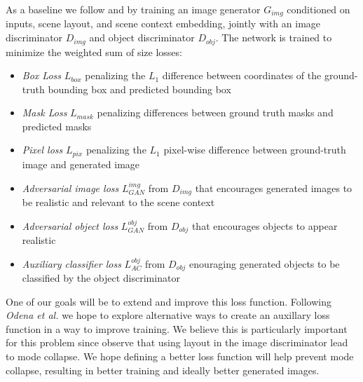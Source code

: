\documentclass{article}
\begin{document}
As a baseline we follow \cite{sg2im} and \cite{sg2imgcontext} by training an image generator $G_{img}$ conditioned on inputs, scene layout, and scene context embedding, jointly with an image discriminator $D_{img}$ and object discriminator $D_{obj}$. The network is trained to minimize the weighted sum of size losses:
\begin{itemize}
\item \textit{Box Loss} $L_{box}$ penalizing the $L_1$ difference between coordinates of the ground-truth bounding box and predicted bounding box
\item \textit{Mask Loss} $L_{mask}$ penalizing differences between ground truth masks and predicted masks
\item \textit{Pixel loss} $L_{pix}$ penalizing the $L_1$ pixel-wise difference between ground-truth image and generated image
\item \textit{Adversarial image loss} $L_{GAN}^{img}$ from $D_{img}$ that encourages generated images to be realistic and relevant to the scene context
\item \textit{Adversarial object loss} $L_{GAN}^{obj}$ from $D_{obj}$ that encourages objects to appear realistic
\item \textit{Auxiliary classifier loss} $L_{AC}^{obj}$ from $D_{obj}$ enouraging generated objects to be classified by the object discriminator
\end{itemize}

One of our goals will be to extend and improve this loss function. Following \textit{Odena et al.} \cite{auxgan} we hope to explore alternative ways to create an auxillary loss function in a way to improve training. We believe this is particularly important for this problem since \cite{sg2imgcontext} observe that using layout in the image discriminator lead to mode collapse. We hope defining a better loss function will help prevent mode collapse, resulting in better training and ideally better generated images.



\end{document}
